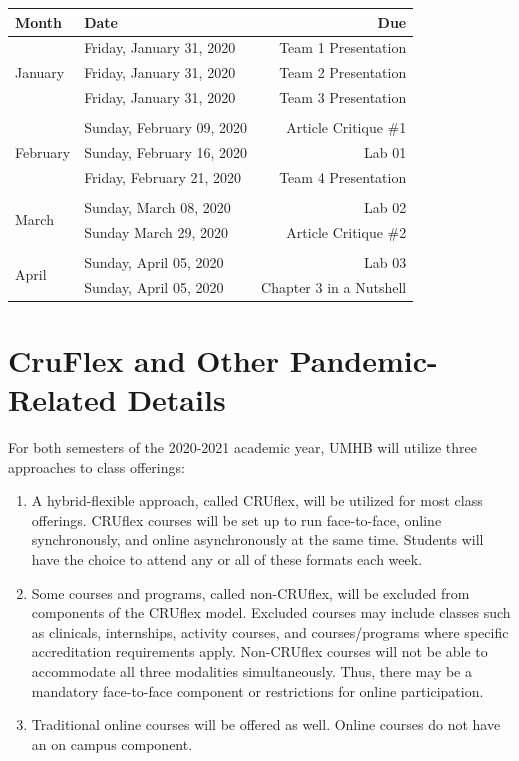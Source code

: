 \documentclass[
]{article}
\begin{document}
\begin{tabularx}{\linewidth}{p{4cm}Xr}
\hline
\textbf{Month} & \textbf{Date} & \textbf{Due} \\
\hline
\multirow{3}{*}{January} & Friday, January 31, 2020 & Team 1 Presentation \\
& Friday, January 31, 2020 & Team 2 Presentation \\
& Friday, January 31, 2020 & Team 3 Presentation \\
\hline
&  &  \\

\multirow{3}{*}{February} & Sunday, February 09, 2020 & Article Critique \#1 \\
& Sunday, February 16, 2020 & Lab 01 \\
& Friday, February 21, 2020 & Team 4 Presentation \\
\hline
&  &  \\

\multirow{2}{*}{March} & Sunday, March 08, 2020 & Lab 02 \\
& Sunday March 29, 2020 & Article Critique \#2 \\
\hline
&  &  \\

\multirow{2}{*}{April} & Sunday, April 05, 2020 & Lab 03 \\
& Sunday, April 05, 2020 & Chapter 3 in a Nutshell \\
\hline
\end{tabularx}

\newpage
\section{CruFlex and Other Pandemic-Related Details}

For both semesters of the 2020-2021 academic year, UMHB will utilize
three approaches to class offerings:

\begin{enumerate}
\item A hybrid-flexible approach, called CRUflex, will be utilized for most class offerings. CRUflex courses will be set up to run face-to-face, online synchronously, and online asynchronously at the same time. Students will have the choice to attend any or all of these formats each week.
\item Some courses and programs, called non-CRUflex, will be excluded from components of the CRUflex model. Excluded courses may include classes such as clinicals, internships, activity courses, and courses/programs where specific accreditation requirements apply. Non-CRUflex courses will not be able to accommodate all three modalities simultaneously. Thus, there may be a mandatory face-to-face component or restrictions for online participation.
\item Traditional online courses will be offered as well. Online courses do not have an on campus component.
\end{enumerate}
\end{document}
